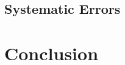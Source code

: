 \documentclass[%
 reprint,
 amsmath,amssymb,
 aps,nofootinbib
]{revtex4-1}
\begin{document}


\subsection{Systematic Errors}


\section{Conclusion}

\end{document}
